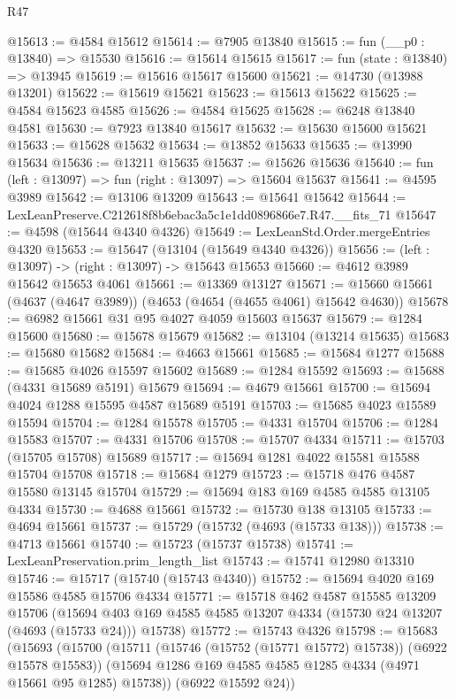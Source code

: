 \begin{lexlean}{R47}
\begin{coremodule}
@15613 := @4584 @15612
@15614 := @7905 @13840
@15615 := fun (__p0 : @13840) => @15530
@15616 := @15614 @15615
@15617 := fun (state : @13840) => @13945
@15619 := @15616 @15617 @15600
@15621 := @14730 (@13988 @13201)
@15622 := @15619 @15621
@15623 := @15613 @15622
@15625 := @4584 @15623 @4585
@15626 := @4584 @15625
@15628 := @6248 @13840 @4581
@15630 := @7923 @13840 @15617
@15632 := @15630 @15600 @15621
@15633 := @15628 @15632
@15634 := @13852 @15633
@15635 := @13990 @15634
@15636 := @13211 @15635
@15637 := @15626 @15636
@15640 := fun (left : @13097) => fun (right : @13097) => @15604 @15637
@15641 := @4595 @3989
@15642 := @13106 @13209
@15643 := @15641 @15642
@15644 := LexLeanPreserve.C212618f8b6ebac3a5c1e1dd0896866e7.R47.__fits_71
@15647 := @4598 (@15644 @4340 @4326)
@15649 := LexLeanStd.Order.mergeEntries @4320
@15653 := @15647 (@13104 (@15649 @4340 @4326))
@15656 := (left : @13097) -> (right : @13097) -> @15643 @15653
@15660 := @4612 @3989 @15642 @15653 @4061
@15661 := @13369 @13127
@15671 := @15660 @15661 (@4637 (@4647 @3989)) (@4653 (@4654 (@4655 @4061) @15642 @4630))
@15678 := @6982 @15661 @31 @95 @4027 @4059 @15603 @15637
@15679 := @1284 @15600
@15680 := @15678 @15679
@15682 := @13104 (@13214 @15635)
@15683 := @15680 @15682
@15684 := @4663 @15661
@15685 := @15684 @1277
@15688 := @15685 @4026 @15597 @15602
@15689 := @1284 @15592
@15693 := @15688 (@4331 @15689 @5191) @15679
@15694 := @4679 @15661
@15700 := @15694 @4024 @1288 @15595 @4587 @15689 @5191
@15703 := @15685 @4023 @15589 @15594
@15704 := @1284 @15578
@15705 := @4331 @15704
@15706 := @1284 @15583
@15707 := @4331 @15706
@15708 := @15707 @4334
@15711 := @15703 (@15705 @15708) @15689
@15717 := @15694 @1281 @4022 @15581 @15588 @15704 @15708
@15718 := @15684 @1279
@15723 := @15718 @476 @4587 @15580 @13145 @15704
@15729 := @15694 @183 @169 @4585 @4585 @13105 @4334
@15730 := @4688 @15661
@15732 := @15730 @138 @13105
@15733 := @4694 @15661
@15737 := @15729 (@15732 (@4693 (@15733 @138)))
@15738 := @4713 @15661
@15740 := @15723 (@15737 @15738)
@15741 := LexLeanPreservation.prim_length_list
@15743 := @15741 @12980 @13310
@15746 := @15717 (@15740 (@15743 @4340))
@15752 := @15694 @4020 @169 @15586 @4585 @15706 @4334
@15771 := @15718
    @462
    @4587
    @15585
    @13209
    @15706
    (@15694 @403 @169 @4585 @4585 @13207 @4334 (@15730 @24 @13207 (@4693 (@15733 @24))) @15738)
@15772 := @15743 @4326
@15798 := @15683
    (@15693
      (@15700
        (@15711 (@15746 (@15752 (@15771 @15772) @15738)) (@6922 @15578 @15583))
        (@15694 @1286 @169 @4585 @4585 @1285 @4334 (@4971 @15661 @95 @1285) @15738))
      (@6922 @15592 @24))

\end{coremodule}
\end{lexlean}
